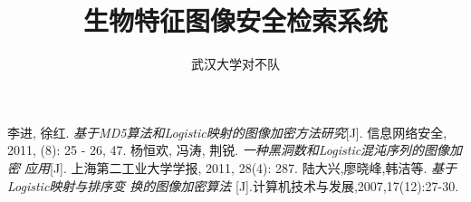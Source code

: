 \documentclass[12pt, titlepage]{ctexrep}
\author{武汉大学对不队}
\title{生物特征图像安全检索系统}
\begin{document}
\tableofcontents







\begin{thebibliography}{9}
 李进, 徐红.
 \emph{基于MD5算法和Logistic映射的图像加密方法研究}[J]. 信息网络安全,
 2011, (8): 25 - 26, 47.
 杨恒欢, 冯涛, 荆锐. \emph{一种黑洞数和Logistic混沌序列的图像加密
  应用}[J]. 上海第二工业大学学报, 2011, 28(4): 287.
 陆大兴,廖晓峰,韩洁等. \emph{基于Logistic映射与排序变
    换的图像加密算法}
[J].计算机技术与发展,2007,17(12):27-30.
\end{thebibliography}
\end{document}
